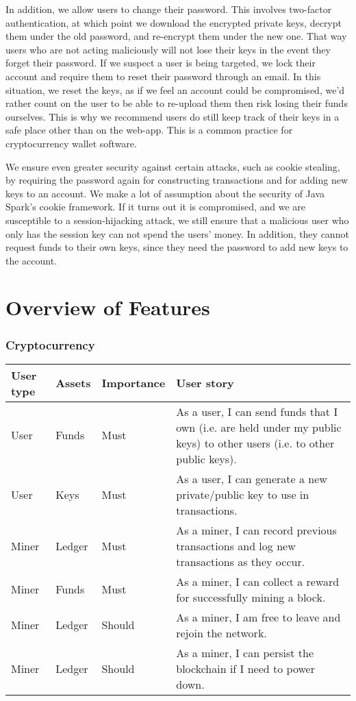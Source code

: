 \documentclass[12pt]{article}
\begin{document}
In addition, we allow users to change their password. This involves two-factor authentication, at which point we download the encrypted private keys, decrypt them under the old password, and re-encrypt them under the new one. That way users who are not acting maliciously will not lose their keys in the event they forget their password. If we suspect a user is being targeted, we lock their account and require them to reset their password through an email. In this situation, we reset the keys, as if we feel an account could be compromised, we'd rather count on the user to be able to re-upload them then risk losing their funds ourselves. This is why we recommend users do still keep track of their keys in a safe place other than on the web-app. This is a common practice for cryptocurrency wallet software.

We ensure even greater security against certain attacks, such as cookie stealing, by requiring the password again for constructing transactions and for adding new keys to an account. We make a lot of assumption about the security of Java Spark's cookie framework. If it turns out it is compromised, and we are susceptible to a session-hijacking attack, we still ensure that a malicious user who only has the session key can not spend the users' money. In addition, they cannot request funds to their own keys, since they need the password to add new keys to the account.

\section{Overview of Features}

\subsubsection*{Cryptocurrency}

\begin{tabularx}{\linewidth}{|l|l|l|X|}
\hline
\textbf{User type} & \textbf{Assets} & \textbf{Importance} & \textbf{User story} \\
\hline
User & Funds & Must & As a user, I can send funds that I own (i.e. are held under my public keys) to other users (i.e. to other public keys). \\
\hline
User & Keys & Must & As a user, I can generate a new private/public key to use in transactions. \\
\hline
Miner & Ledger & Must & As a miner, I can record previous transactions and log new transactions as they occur. \\
\hline
Miner & Funds & Must & As a miner, I can collect a reward for successfully mining a block. \\
\hline
Miner & Ledger & Should & As a miner, I am free to leave and rejoin the network. \\
\hline
Miner & Ledger & Should & As a miner, I can persist the blockchain if I need to power down. \\
\hline
\end{tabularx}
\end{document}
